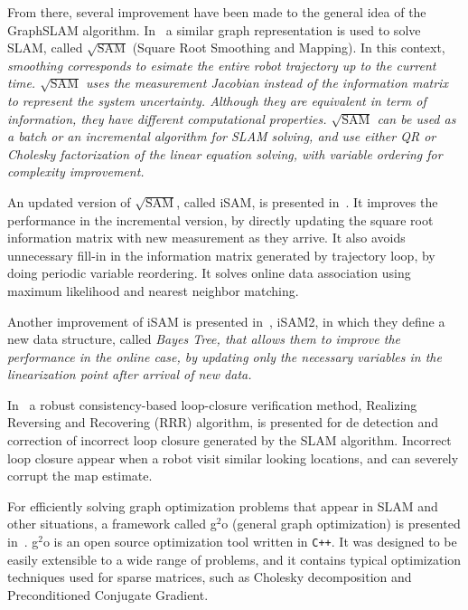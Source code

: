 From there, several improvement have been made to the general idea of the GraphSLAM algorithm. In~\cite{sqrtsam} a similar graph representation is used to solve SLAM, called $\sqrt{\text{SAM}}$ (Square Root Smoothing and Mapping). In this context, \it{smoothing} corresponds to esimate the entire robot trajectory up to the current time. $\sqrt{\text{SAM}}$ uses the measurement Jacobian instead of the information matrix to represent the system uncertainty. Although they are equivalent in term of information, they have different computational properties. $\sqrt{\text{SAM}}$ can be used as a batch or an incremental algorithm for SLAM solving, and use either QR or Cholesky factorization of the linear equation solving, with variable ordering for complexity improvement. 

An updated version of $\sqrt{\text{SAM}}$, called iSAM, is presented in~\cite{isam}. It improves the performance in the incremental version, by directly updating the square root information matrix with new measurement as they arrive. It also avoids unnecessary fill-in in the information matrix generated by trajectory loop, by doing periodic variable reordering. It solves online data association using maximum likelihood and nearest neighbor matching.

Another improvement of iSAM is presented in~\cite{isam2}, iSAM2, in which they define a new data structure, called \it{Bayes Tree}, that allows them to improve the performance in the online case, by updating only the necessary variables in the linearization point after arrival of new data. 

In~\cite{robustloop} a robust consistency-based loop-closure verification method, Realizing Reversing and Recovering (RRR) algorithm, is presented for de detection and correction of incorrect loop closure generated by the SLAM algorithm. Incorrect loop closure appear when a robot visit similar looking locations, and can severely corrupt the map estimate.     

For efficiently solving graph optimization problems that appear in SLAM and other situations, a framework called g$^2$o (general graph optimization) is presented in~\cite{g2o}. g$^2$o is an open source optimization tool written in \verb!C++!.  It was designed to be easily extensible to a wide range of problems, and it contains typical optimization techniques used for sparse matrices, such as Cholesky decomposition and Preconditioned Conjugate Gradient. 

